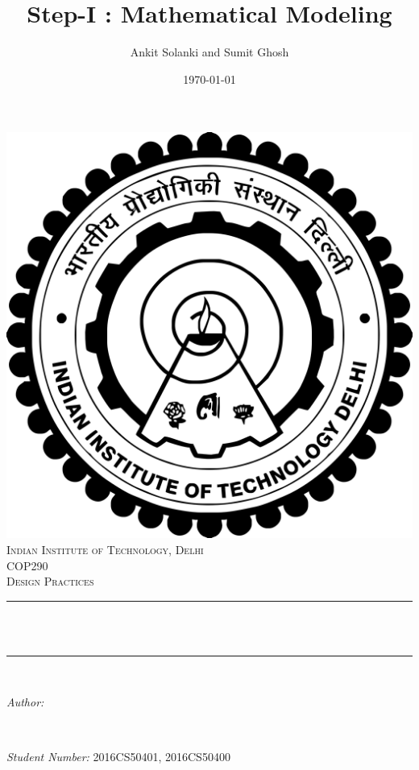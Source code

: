 \documentclass[12pt]{article}
\title{Step-I : Mathematical Modeling}								%
\author{Ankit Solanki and Sumit Ghosh}								%
\date{\today}											%
\makeatletter
\let\thetitle\@title
\let\theauthor\@author
\let\thedate\@date
\makeatother
\begin{document}

\begin{titlepage}
	\centering
    \vspace*{0.5 cm}
    \includegraphics[scale = 0.05]{IITD.png}\\[1.0 cm]	%
    \textsc{\LARGE Indian Institute of Technology, Delhi}\\[2.0 cm]	%
	\textsc{\Large COP290}\\[0.5 cm]				%
	\textsc{\large Design Practices}\\[0.5 cm]				%
	\rule{\linewidth}{0.2 mm} \\[0.4 cm]
	{ \huge \bfseries \thetitle}\\
	\rule{\linewidth}{0.2 mm} \\[1.5 cm]
	
	\begin{minipage}{0.4\textwidth}
		\begin{flushleft} \large
			\emph{Author:}\\
			\theauthor
			\end{flushleft}
			\end{minipage}~
			\begin{minipage}{0.4\textwidth}
			\begin{flushright} \large
			\emph{Student Number:}
			2016CS50401, 2016CS50400
		\end{flushright}
	\end{minipage}\\[2 cm]
	
	{\large \thedate}\\[2 cm]
 
	\vfill
	
\end{titlepage}
\end{document}
